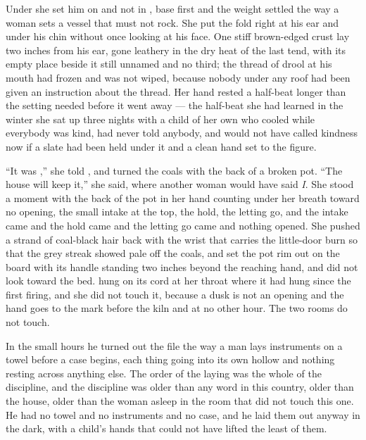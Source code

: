 Under  she set him on  and not in , base first and the weight settled the way a woman sets a vessel that must not rock. She put the fold right at his ear and under his chin without once looking at his face. One stiff brown-edged crust lay two inches from his ear, gone leathery in the dry heat of the last tend, with its empty place beside it still unnamed and no third; the thread of drool at his mouth had frozen and was not wiped, because nobody under any roof had been given an instruction about the thread. Her hand rested a half-beat longer than the setting needed before it went away --- the half-beat she had learned in the winter she sat up three nights with a child of her own who cooled while everybody was kind, had never told anybody, and would not have called kindness now if a slate had been held under it and a clean hand set to the figure.

“It was ,” she told , and turned the coals with the back of a broken pot. “The house will keep it,” she said, where another woman would have said \emph{I}. She stood a moment with the back of the pot in her hand counting under her breath toward no opening, the small intake at the top, the hold, the letting go, and the intake came and the hold came and the letting go came and nothing opened. She pushed a strand of coal-black hair back with the wrist that carries the little-door burn so that the grey streak showed pale off the coals, and set the pot rim out on the board with its handle standing two inches beyond the reaching hand, and did not look toward the bed.  hung on its cord at her throat where it had hung since the first firing, and she did not touch it, because a dusk is not an opening and the hand goes to the mark before the kiln and at no other hour. The two rooms do not touch.

\scenebreak

In the small hours he turned out the file the way a man lays instruments on a towel before a case begins, each thing going into its own hollow and nothing resting across anything else. The order of the laying was the whole of the discipline, and the discipline was older than any word in this country, older than the house, older than the woman asleep in the room that did not touch this one. He had no towel and no instruments and no case, and he laid them out anyway in the dark, with a child's hands that could not have lifted the least of them.

